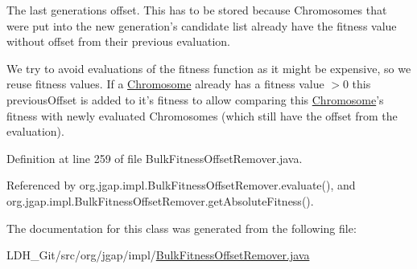 The last generations offset. This has to be stored because Chromosomes that were put into the new generation's candidate list already have the fitness value without offset from their previous evaluation. 

We try to avoid evaluations of the fitness function as it might be expensive, so we reuse fitness values. If a \hyperlink{classorg_1_1jgap_1_1_chromosome}{Chromosome} already has a fitness value $>$0 this previous\-Offset is added to it's fitness to allow comparing this \hyperlink{classorg_1_1jgap_1_1_chromosome}{Chromosome}'s fitness with newly evaluated Chromosomes (which still have the offset from the evaluation). 

Definition at line 259 of file Bulk\-Fitness\-Offset\-Remover.\-java.



Referenced by org.\-jgap.\-impl.\-Bulk\-Fitness\-Offset\-Remover.\-evaluate(), and org.\-jgap.\-impl.\-Bulk\-Fitness\-Offset\-Remover.\-get\-Absolute\-Fitness().



The documentation for this class was generated from the following file\-:\begin{DoxyCompactItemize}
\item 
L\-D\-H\-\_\-\-Git/src/org/jgap/impl/\hyperlink{_bulk_fitness_offset_remover_8java}{Bulk\-Fitness\-Offset\-Remover.\-java}\end{DoxyCompactItemize}
